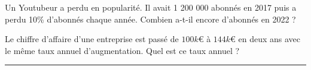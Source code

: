 \documentclass[a4paper,10pt]{article}
\newcounter{exercicesCounter}
\begin{document}
{\begin{minipage}{0.23\linewidth}
		\vspace{\placeDeCorrection}
	\end{minipage}
	\hfill\vline\hfill
	\begin{minipage}{0.23\linewidth}
		Un Youtubeur a perdu en
		popularité. Il avait 1 200 000
		abonnés en 2017 puis a perdu
		10\% d’abonnés chaque année.
		Combien a-t-il encore d’abonnés
		en 2022 ?

		\vspace{\placeDeCorrection}
	\end{minipage}
	\hfill\vline\hfill
	\begin{minipage}{0.23\linewidth}
		Le chiffre d’affaire d’une
		entreprise est passé de $100 k€$ à
		$144 k€$ en deux ans avec le même
		taux annuel d’augmentation.
		Quel est ce taux annuel ?

		\vspace{\placeDeCorrection}
	\end{minipage}
}

\vspace{1em}
\hrule
\vspace{1em}

\setcounter{exercicesCounter}{1}
\end{document}
